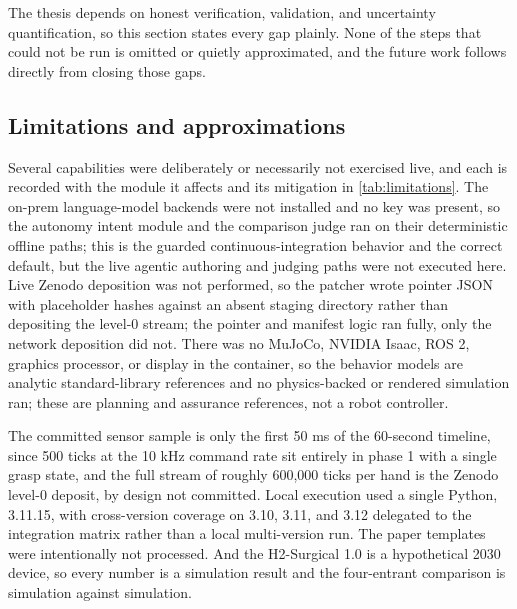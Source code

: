 
The thesis depends on honest verification, validation, and uncertainty
quantification, so this section states every gap plainly. None of the steps that
could not be run is omitted or quietly approximated, and the future work follows
directly from closing those gaps.

\subsection{Limitations and approximations}

Several capabilities were deliberately or necessarily not exercised live, and
each is recorded with the module it affects and its mitigation in
\autoref{tab:limitations}. The on-prem language-model backends were not installed
and no key was present, so the autonomy intent module and the comparison judge
ran on their deterministic offline paths; this is the guarded
continuous-integration behavior and the correct default, but the live agentic
authoring and judging paths were not executed here. Live Zenodo deposition was
not performed, so the patcher wrote pointer JSON with placeholder hashes against
an absent staging directory rather than depositing the level-0 stream; the
pointer and manifest logic ran fully, only the network deposition did not. There
was no MuJoCo, NVIDIA Isaac, ROS 2, graphics processor, or display in the
container, so the behavior models are analytic standard-library references and no
physics-backed or rendered simulation ran; these are planning and assurance
references, not a robot controller. 

The committed sensor sample is only the first
50 ms of the 60-second timeline, since 500 ticks at the 10 kHz command rate sit
entirely in phase 1 with a single grasp state, and the full stream of roughly
600,000 ticks per hand is the Zenodo level-0 deposit, by design not committed.
Local execution used a single Python, 3.11.15, with cross-version coverage on
3.10, 3.11, and 3.12 delegated to the integration matrix rather than a local
multi-version run. The paper templates were intentionally not processed. And the
H2-Surgical 1.0 is a hypothetical 2030 device, so every number is a simulation
result and the four-entrant comparison is simulation against simulation.

